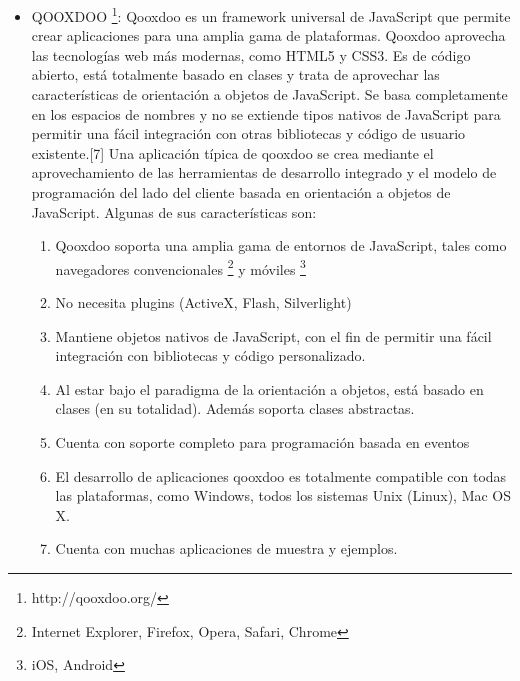 \begin{itemize}
 \item QOOXDOO \footnote{http://qooxdoo.org/}: Qooxdoo es un framework universal de JavaScript que permite 
  crear aplicaciones para una amplia gama de plataformas. Qooxdoo aprovecha las tecnologías web más modernas, 
  como HTML5 y CSS3. Es de código abierto, está totalmente basado en clases y trata de aprovechar las características 
  de orientación a objetos de JavaScript. Se basa completamente en los espacios de nombres y no se extiende tipos 
  nativos de JavaScript para permitir una fácil integración con otras bibliotecas y código de usuario existente.[7]
  Una aplicación típica de qooxdoo se crea mediante el aprovechamiento de las herramientas de desarrollo integrado 
  y el modelo de  programación del lado del cliente basada en orientación a objetos de JavaScript.
  Algunas de sus características son:
   \begin{enumerate}
    \item Qooxdoo soporta una amplia gama de entornos de JavaScript, tales como navegadores convencionales
      \footnote{Internet Explorer, Firefox, Opera, Safari, Chrome} y móviles \footnote{iOS, Android}
    \item No necesita plugins (ActiveX, Flash, Silverlight)
    \item Mantiene objetos nativos de JavaScript, con el fin de permitir una fácil integración con bibliotecas 
	  y código personalizado. 
    \item Al estar bajo el paradigma de la orientación a objetos, está basado en clases (en su totalidad). 
	  Además soporta clases abstractas.
    \item Cuenta con soporte completo para programación basada en eventos
    \item El desarrollo de aplicaciones qooxdoo es totalmente compatible con todas las plataformas, como Windows, 
	  todos los sistemas Unix (Linux), Mac OS X.
    \item Cuenta con muchas aplicaciones de muestra y ejemplos.
   \end{enumerate}
   

\end{itemize}
